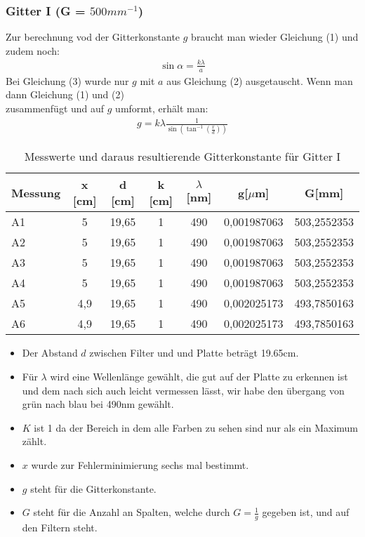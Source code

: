 \subsubsection{Gitter I (G = $500mm^{-1}$)}

Zur berechnung vod der Gitterkonstante $g$ braucht man wieder Gleichung (1) und zudem noch:
\begin{align}
	\sin \alpha = \frac{k\lambda}{a}
\end{align}
Bei Gleichung (3) wurde nur $g$ mit $a$ aus Gleichung (2) ausgetauscht. Wenn man dann Gleichung (1) und (2)\\ zusammenfügt und auf $g$ umformt, erhält man:
\begin{align*}
	g = k \lambda \frac{1}{\sin (\tan^{-1} (\frac{x}{d}))}
\end{align*}

\begin{table}[H]
	\centering
	\begin{tabular}{lcccccc}
		\toprule
		Messung & x [cm] & d [cm] & k [cm] & $\lambda$ [nm] & g[$\mu$m]   & G[mm]       \\
		\midrule
		A1      & 5      & 19,65  & 1      & 490            & 0,001987063 & 503,2552353 \\
		A2      & 5      & 19,65  & 1      & 490            & 0,001987063 & 503,2552353 \\
		A3      & 5      & 19,65  & 1      & 490            & 0,001987063 & 503,2552353 \\
		A4      & 5      & 19,65  & 1      & 490            & 0,001987063 & 503,2552353 \\
		A5      & 4,9    & 19,65  & 1      & 490            & 0,002025173 & 493,7850163 \\
		A6      & 4,9    & 19,65  & 1      & 490            & 0,002025173 & 493,7850163 \\
		\bottomrule
	\end{tabular}
	\caption{Messwerte und daraus resultierende Gitterkonstante für Gitter I}
\end{table}

\begin{itemize}
	\item Der Abstand $d$ zwischen Filter und und Platte beträgt 19.65cm.
	\item Für $\lambda$ wird eine Wellenlänge gewählt, die gut auf der Platte zu erkennen ist und dem nach sich auch leicht vermessen lässt, wir habe den übergang von grün nach blau bei 490nm gewählt.
	\item $K$ ist 1 da der Bereich in dem alle Farben zu sehen sind nur als ein Maximum zählt.
	\item $x$ wurde zur Fehlerminimierung sechs mal bestimmt.
	\item $g$ steht für die Gitterkonstante.
	\item $G$ steht für die Anzahl an Spalten, welche durch $G = \frac{1}{g}$ gegeben ist, und auf den Filtern steht.
\end{itemize}

